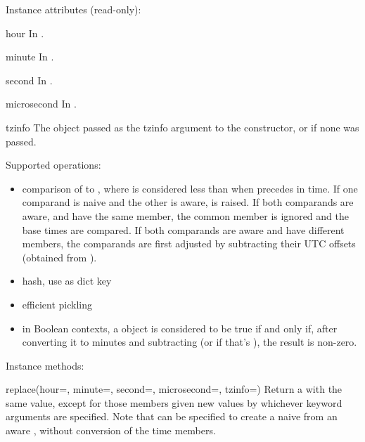 Instance attributes (read-only):

\begin{memberdesc}{hour}
  In .
\end{memberdesc}

\begin{memberdesc}{minute}
  In .
\end{memberdesc}

\begin{memberdesc}{second}
  In .
\end{memberdesc}

\begin{memberdesc}{microsecond}
  In .
\end{memberdesc}

\begin{memberdesc}{tzinfo}
  The object passed as the tzinfo argument to the 
  constructor, or  if none was passed.
\end{memberdesc}

Supported operations:

\begin{itemize}
  \item
    comparison of  to ,
    where  is considered less than  when  precedes
     in time.  If one comparand is naive and the other is aware,
     is raised.  If both comparands are aware, and
    have the same  member, the common 
    member is ignored and the base times are compared.  If both
    comparands are aware and have different  members,
    the comparands are first adjusted by subtracting their UTC offsets
    (obtained from ).

  \item
    hash, use as dict key

  \item
    efficient pickling

  \item
    in Boolean contexts, a  object is considered to be
    true if and only if, after converting it to minutes and
    subtracting  (or  if that's
    ), the result is non-zero.
\end{itemize}

Instance methods:

\begin{methoddesc}{replace}(hour=, minute=, second=, microsecond=, tzinfo=)
  Return a  with the same value, except for those members given
  new values by whichever keyword arguments are specified.  Note that
   can be specified to create a naive  from
  an aware , without conversion of the time members.
\end{methoddesc}

